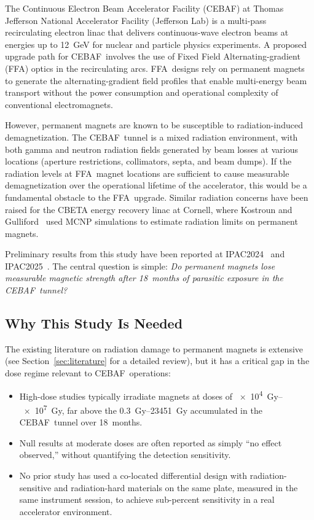 \documentclass[11pt,letterpaper]{article}
\newcommand{\CEBAF}{CEBAF}
\newcommand{\FFA}{FFA}
\newcommand{\JLab}{Jefferson Lab}
\begin{document}
The Continuous Electron Beam Accelerator Facility (\CEBAF) at Thomas Jefferson
National Accelerator Facility (\JLab) is a multi-pass recirculating electron
linac that delivers continuous-wave electron beams at energies up to
\SI{12}{GeV} for nuclear and particle physics experiments. A proposed upgrade
path for \CEBAF~involves the use of Fixed Field Alternating-gradient (\FFA)
optics in the recirculating arcs. \FFA~designs rely on permanent magnets to
generate the alternating-gradient field profiles that enable multi-energy beam
transport without the power consumption and operational complexity of
conventional electromagnets.

However, permanent magnets are known to be susceptible to radiation-induced
demagnetization. The \CEBAF~tunnel is a mixed radiation environment, with both
gamma and neutron radiation fields generated by beam losses at various locations
(aperture restrictions, collimators, septa, and beam dumps). If the radiation
levels at \FFA~magnet locations are sufficient to cause measurable
demagnetization over the operational lifetime of the accelerator, this would be
a fundamental obstacle to the \FFA~upgrade. Similar radiation concerns have
been raised for the CBETA energy recovery linac at Cornell, where Kostroun and
Gulliford~\cite{Kostroun2019} used MCNP simulations to estimate radiation
limits on permanent magnets.

Preliminary results from this study have been reported at
IPAC2024~\cite{Bodenstein2024a,Bodenstein2024b} and
IPAC2025~\cite{Bodenstein2025}. The central question is simple: \textit{Do
permanent magnets lose measurable magnetic strength after 18~months of
parasitic exposure in the \CEBAF~tunnel?}

\subsection{Why This Study Is Needed}

The existing literature on radiation damage to permanent magnets is extensive
(see Section~\ref{sec:literature} for a detailed review), but it has a critical
gap in the dose regime relevant to \CEBAF~operations:

\begin{itemize}
    \item High-dose studies \cite{Simos2018,Bizen2016,Alderman}
    typically irradiate magnets at doses of
    \SIrange{e4}{e7}{Gy}, far above the \SIrange{0.3}{23451}{Gy} accumulated
    in the \CEBAF~tunnel over 18~months.
    \item Null results at moderate doses are often reported as simply
    ``no effect observed,'' without quantifying the detection sensitivity.
    \item No prior study has used a co-located differential design
    with radiation-sensitive and radiation-hard materials on the same plate,
    measured in the same instrument session, to achieve sub-percent sensitivity
    in a real accelerator environment.
\end{itemize}
\end{document}
